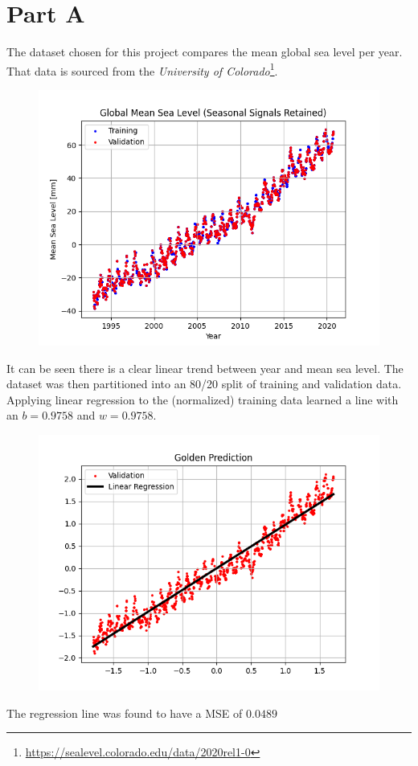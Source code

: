 \newpage
\section{Part A}
\label{sec:sec_a}
The dataset chosen for this project compares the mean global sea level per year. That data is sourced from the \textit{University of Colorado}\footnote{\url{https://sealevel.colorado.edu/data/2020rel1-0}}.


\begin{figure}[htpb]
	\centering
	\includegraphics[width=\columnwidth]{figures/dataset.png}
	\label{fig:part_a}
\end{figure}

It can be seen there is a clear linear trend between year and mean sea level. The dataset was then partitioned into an 80/20 split of training and validation data. Applying linear regression to the (normalized) training data learned a line with an $b=0.9758$ and $w=0.9758$.


\begin{figure}[htpb]
	\centering
	\includegraphics[width=\columnwidth]{figures/linear_regression.png}
	\label{fig:part_a}
\end{figure}

The regression line was found to have a MSE of $0.0489$